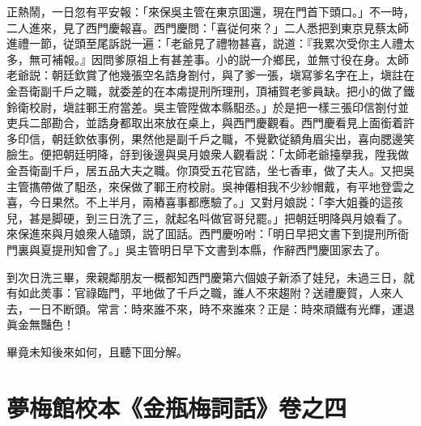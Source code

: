 正熱鬧，一日忽有平安報：「來保吳主管在東京囬還，現在門首下頭口。」不一時，二人進來，見了西門慶報喜。西門慶問：「喜従何來？」二人悉把到東京見蔡太師進禮一節，従頭至尾訴説一遍：「老爺見了禮物甚喜，説道：『我累次受你主人禮太多，無可補報。』因問爹原祖上有甚差事。小的説一介鄉民，並無寸役在身。太師老爺説：朝廷欽賞了他幾張空名誥身劄付，與了爹一張，塡寫爹名字在上，塡註在金吾衛副千戶之職，就委差的在本䖏提刑所理刑，頂補賀老爹員缺。把小的做了鐵鈴衛校尉，塡註鄆王府當差。吳主管陞做本縣馹丞。」於是把一樣三張印信劄付並吏兵二部勘合，並誥身都取出來放在桌上，與西門慶觀看。西門慶看見上面銜着許多印信，朝廷欽依事例，果然他是副千戶之職，不覺歡従額角眉尖出，喜向腮邊笑臉生。便把朝廷明降，㧱到後邊與吳月娘衆人觀看説：「太師老爺擡擧我，陞我做金吾衛副千戶，居五品大夫之職。你頂受五花官誥，坐七香車，做了夫人。又把吳主管㩦帶做了馹丞，來保做了鄆王府校尉。吳神僊相我不少紗帽戴，有平地登雲之喜，今日果然。不上半月，兩樁喜事都應驗了。」又對月娘説：「李大姐養的這孩兒，甚是脚硬，到三日洗了三，就起名呌做官哥兒罷。」把朝廷明降與月娘看了。來保進來與月娘衆人磕頭，説了囬話。西門慶吩咐：「明日早把文書下到提刑所衙門裏與夏提刑知會了。」吳主管明日早下文書到本縣，作辭西門慶囬家去了。

到次日洗三畢，衆親鄰朋友一概都知西門慶第六個娘子新添了娃兒，未過三日，就有如此羙事：官祿臨門，平地做了千戶之職，誰人不來趨附？送禮慶賀，人來人去，一日不断頭。常言：時來誰不來，時不來誰來？正是：時來頑鐵有光輝，運退眞金無豔色！

畢竟未知後來如何，且聽下囬分解。

\part*{夢梅館校本《金瓶梅詞話》卷之四}

